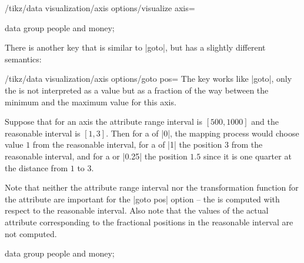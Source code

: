 \begin{key}{/tikz/data visualization/axis options/visualize axis=}
\begin{codeexample}[]
\tikz \datavisualization [
    our system,
    x axis={attribute=time, length=4cm},
    left axis ={attribute=money},
    right axis={attribute=people},
    visualize as line/.list={people 1, people 2, money 1, money 2}]
  data group {people and money};  
\end{codeexample}

  There is another key that is similar to |goto|, but has a slightly
  different semantics:
  \begin{key}{/tikz/data visualization/axis options/goto pos=}
    The key works like |goto|, only the  is not
    interpreted as a value but as a fraction of the way between the
    minimum and the maximum value for this axis.

    Suppose that for an axis the attribute range interval is
    $[500,1000]$ and the reasonable interval is $[1,3]$. Then for a
     of |0|, the mapping process would choose value
    $1$ from the reasonable interval, for a  of |1| the
    position $3$ from the reasonable interval, and for a
     or |0.25| the position $1.5$ since it is one
    quarter at the distance from $1$ to $3$.

    Note that neither the attribute range interval nor the
    transformation function for the attribute are important for the
    |goto pos| option -- the  is computed with respect
    to the reasonable interval. Also note that the values of the
    actual attribute corresponding to the fractional positions in the
    reasonable interval are not computed.
\begin{codeexample}[]
\tikz \datavisualization [
    our system,
    x axis={attribute=time, length=4cm},
    left axis ={attribute=money},
    right axis={attribute=people},
    visualize as line/.list={people 1, people 2, money 1, money 2}]
  data group {people and money};  
\end{codeexample}
  \end{key}


\end{key}
